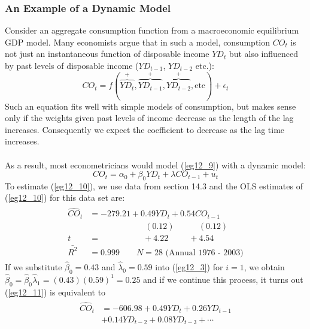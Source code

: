 \documentclass[11pt]{article}
\begin{document}
\subsubsection{An Example of a Dynamic Model}
Consider an aggregate consumption function from a macroeconomic equilibrium GDP model. Many economists argue that in such a model, consumption $CO_t$ is not just an instantaneous function of disposable income $YD_t$ but also influenced by past levels of disposable income ($YD_{t-1}$, $YD_{t-2}$ etc.):
\begin{equation}
CO_t = f(\overbrace{YD_t}^+,\overbrace{YD_{t-1}}^+,\overbrace{YD_{t-2}}^+,\text{etc}) + \epsilon_t \label{eg12_9}
\end{equation}
Such an equation fits well with simple models of consumption, but makes sense only if the weights given past levels of income decrease as the length of the lag increases. Consequently we expect the coefficient to decrease as the lag time increases.\\ \\
As a result, most econometricians would model (\ref{eg12_9}) with a dynamic model:
\begin{equation}
CO_t = \alpha_0 + \beta_0YD_t + \lambda CO_{t-1} + u_t \label{eg12_10}
\end{equation}
To estimate (\ref{eg12_10}), we use data from section 14.3 and the OLS estimates of (\ref{eg12_10}) for this data set are:
\begin{align}
\label{eg12_11}
\begin{split}
\widehat{CO}_t &= -279.21 + {0.49YD_t} + {0.54CO_{t-1}}\\
&\>\>\>\>\>\>\>\>\>\>\>\>\>\>\>\>\>\>\>\>\>\>\>\>\>\>\>\>\>\> (0.12) 
\>\>\>\>\>\>\>\>\>\>\>\>\> (0.12)\\
t&=\>\>\>\>\>\>\>\>\>\>\>\>\>\>\>\>\>\>\>\>\>\>\> +4.22 
\>\>\>\>\>\>\>\>\>\>\> +4.54\\
\bar{R^2}&= 0.999 \quad\quad N=28 \text{ (Annual 1976 - 2003)}
\end{split}
\end{align}
If we substitute $\hat{\beta}_0=0.43$ and $\hat{\lambda}_0=0.59$ into (\ref{eg12_3}) for $i=1$, we obtain $\hat{\beta}_{0}=\hat{\beta}_0\hat{\lambda}_1 = (0.43)(0.59)^1 = 0.25$ and if we continue this process, it turns out (\ref{eg12_11}) is equivalent to 
\begin{align}
\label{eg12_12}
\begin{split}
\widehat{CO}_t &= -606.98 + 0.49YD_t + 0.26YD_{t-1} \\&+ 0.14YD_{t-2} + 0.08YD_{t-3} + \cdots
\end{split}
\end{align}
\end{document}
